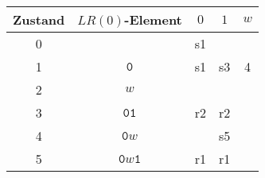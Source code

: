 \begin{center}
\begin{tabular}{|c|c|cc|c|}
\hline
Zustand&$LR(0)$-Element&$0$&$1$&$w$\\
\hline
0&$\boxed{\phantom{\texttt{0}}}$&s1&&\\
1&$\boxed{\texttt{0}}$&s1&s3&4\\
2&$\boxed{w}$&&&\\
3&$\boxed{\texttt{01}}$&r2&r2&\\
4&$\boxed{\texttt{0}w}$&&s5&\\
5&$\boxed{\texttt{0}w\texttt{1}}$&r1&r1&\\
\hline
\end{tabular}
\end{center}
